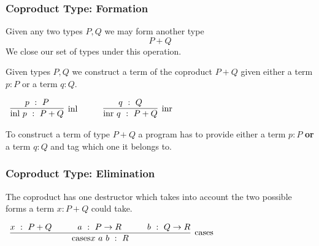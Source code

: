 \documentclass{beamer}
\theoremstyle{indentDefn} \newtheorem{defn}[]{Definition}
\begin{document}
\begin{frame}
  \frametitle{Coproduct Type: Formation}

  Given any two types $P,Q$ we may form another type   
  $$P + Q$$
  We close our set of types under this operation.

  Given types $P,Q$ we construct a term of the coproduct $P+Q$ given either a term $p : P$ or a term $q : Q$. 

  \vspace{0.5cm}

  \begin{center}
    $\begin{array}{c c c}
      \infer[\text{\inl}]{\inl \ p \ : \ P + Q}{p \ : \ P}

      &
      \quad
      &

      \infer[\text{\inr}]{\inr \ q \ : \ P + Q}{q \ : \ Q}

    \end{array}$
  \end{center}

  To construct a term of type $P + Q$ a program has to provide either a term $p : P$ {\bf or} a term $q : Q$ and tag which one it belongs to. 



\end{frame}

\begin{frame}
  \frametitle{Coproduct Type: Elimination}

  The coproduct has one destructor which takes into account the two possible forms a term $x : P + Q$ could take. 
  
  \vspace{0.5cm}

  \begin{center}
    $\begin{array}{c}
      \infer[\sumElim]{\sumElim x \ a \ b \ : \ R}{x \ : \ P + Q \quad & \quad a \ : \ P \to R \quad & \quad  b \ : \ Q \to R}
    \end{array}$
  \end{center}

\end{frame}
\end{document}
